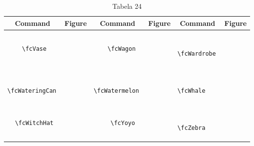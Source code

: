 \documentclass[x11names]{article}
\begin{document}
\begin{table}[H]\centering\begin{tabular}{|c|c|c|c|c|c|}\hline{\bf Command} & {\bf Figure} & {\bf Command} & {\bf Figure} & {\bf Command} & {\bf Figure}\\	\hline	&\multirow{5}{*}{	\fcVase	[scale=0.16]} & &\multirow{5}{*}{	\fcWagon	[scale=0.16]} & &\multirow{5}{*}{	\fcWardrobe	[scale=0.16]}\\	& & & & & \\	& & & & & \\	\verb|	\fcVase	| & & \verb|	\fcWagon	| & & \verb|	\fcWardrobe	| & \\	& & & & & \\	& & & & & \\	& & & & & \\	\hline									
		&\multirow{5}{*}{	\fcWateringCan	[scale=0.16]} & &\multirow{5}{*}{	\fcWatermelon	[scale=0.64]} & &\multirow{5}{*}{	\fcWhale	[scale=0.16]}\\	& & & & & \\	& & & & & \\	\verb|	\fcWateringCan	| & & \verb|	\fcWatermelon	| & & \verb|	\fcWhale	| & \\	& & & & & \\	& & & & & \\	& & & & & \\	\hline									
		&\multirow{5}{*}{	\fcWitchHat	[scale=0.64]} & &\multirow{5}{*}{	\fcYoyo	[scale=0.16]} & &\multirow{5}{*}{	\fcZebra	[scale=0.16]}\\	& & & & & \\	& & & & & \\	\verb|	\fcWitchHat	| & & \verb|	\fcYoyo	| & & \verb|	\fcZebra	| & \\	& & & & & \\	& & & & & \\	& & & & & \\		\hline 	\hline 	\end{tabular}	\caption{	Tabela 24	}\label{Tab24}\end{table}




	
\end{document}
